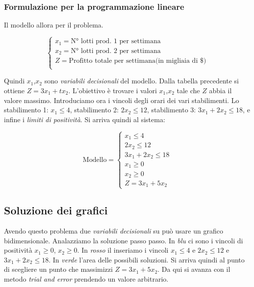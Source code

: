 \documentclass{article}
\begin{document}
      \subsubsection{Formulazione per la programmazione lineare}
        Il modello allora per il problema.

        $$
          \begin{cases}
            x_1 = \text{N° lotti prod. 1 per settimana} \\
            x_2 = \text{N° lotti prod. 2 per settimana} \\ 
            Z = \text{Profitto totale per settimana(in migliaia di \$)} \\
          \end{cases}
        $$

        Quindi $x_1$,$x_2$ sono \textit{variabili decisionali} del modello. Dalla tabella precedente si ottiene $Z = 3x_1+tx_2$. L'obiettivo è trovare i valori $x_1$,$x_2$ tale che $Z$ abbia il valore massimo. Introduciamo ora i vincoli degli orari dei vari stabilimenti. Lo stabilimento 1: $x_1\le4$, stabilimento 2: $2x_2\le12$, stabilimento 3: $3x_1+2x_2\le18$, e infine i \textit{limiti di positività}. Si arriva quindi al sistema:

        $$ \text{Modello}=
          \begin{cases}
            x_1 \le 4 \\
            2x_2 \le 12 \\
            3x_1 + 2x_2 \le 18 \\
            x_1 \ge 0 \\
            x_2 \ge 0 \\
            Z = 3x_1 + 5x_2
            
          \end{cases}
        $$

      \subsection{Soluzione dei grafici}
        Avendo questo problema due \textit{variabili decisionali} su può usare un grafico bidimensionale. Analazziamo la soluzione passo passo. In \textit{blu} ci sono i vincoli di positività $x_1\ge0$, $x_2\ge0$. In \textit{rosso} il inseriamo i vincoli $x_1\le4$ e $2x_2\le12$ e $3x_1+2x_2\le18$. In \textit{verde} l'area delle possibili soluzioni. Si arriva quindi al punto di scegliere un punto che massimizzi $Z=3x_1+5x_2$. Da qui si avanza con il metodo \textit{trial and error} prendendo un valore arbitrario.
\end{document}
